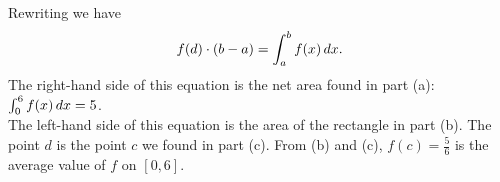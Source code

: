 \documentclass{ximera}
\begin{document}
\begin{problem}
\begin{enumerate}
\begin{explanation}
		        Rewriting we have
		        \[
		        f(d) \cdot (b-a) = \int_a^b f(x) \,d x.
		        \]
		      The right-hand side of this equation is the net area found in part (a): $\int_0^6 f(x) \,d x=5$.\\
		       The left-hand side of this equation is the area of the rectangle in part (b).  The point $d$ is the point $c$ we found in part (c).  From (b) and (c), $f(c)=\frac{5}{6}$ is the average value of $f$ on $[0,6]$.
		 \end{explanation}
    \end{enumerate}
\end{problem}
\end{document}
